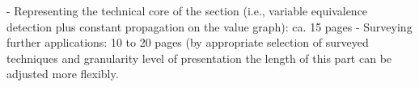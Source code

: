 - Representing the technical core of the section (i.e., variable
 equivalence detection plus constant propagation on the value graph):
 ca. 15 pages
- Surveying further applications: 10 to 20 pages (by appropriate 
 selection of surveyed techniques and granularity level of presentation
 the length of this part can be adjusted more flexibly.


% 
% 
% 
% 
% 
